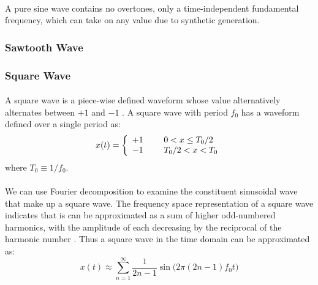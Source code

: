 \documentclass[12pt,letterpaper]{article}
\begin{document}
\paragraph*{}A pure sine wave contains no overtones, only a time-independent fundamental frequency, which can take on any value due to synthetic generation.


\subsubsection{Sawtooth Wave}

\paragraph*{}


\subsubsection{Square Wave}

\paragraph*{}A square wave is a piece-wise defined waveform whose value alternatively alternates between $+1$ and $-1$ \cite{White,Olson}. A square wave with period $f_0$ has a waveform defined over a single period as:
\begin{equation}
\label{eqn-SquareWave}
x(t) =  \left\{
\begin{array}{ll}
    +1 & \text{\hspace{0.5cm}} 0 < x \leq T_0 / 2 \\
    -1 & \text{\hspace{0.5cm}} T_0/2 < x < T_0
\end{array} 
\right.
\end{equation}
where $T_0 \equiv 1/f_0$.

\paragraph*{}We can use Fourier decomposition to examine the constituent sinusoidal wave that make up a square wave. The frequency space representation of a square wave indicates that is can be approximated as a sum of higher odd-numbered harmonics, with the amplitude of each decreasing by the reciprocal of the harmonic number \cite{White}. Thus a square wave in the time domain can be approximated as:
\begin{equation}
x(t) \approx \sum_{n = 1}^{\infty} \frac{1}{2n-1} \sin \bigg( 2 \pi (2n - 1)f_0 t \bigg)
\end{equation} 
\end{document}

